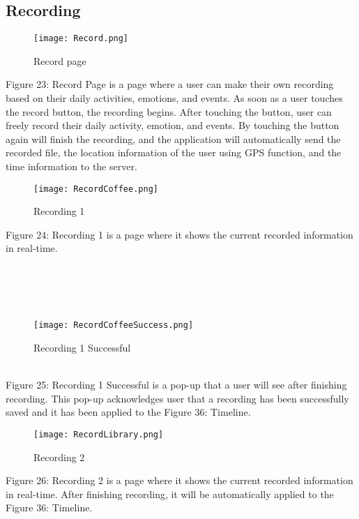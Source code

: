 \documentclass[conference]{IEEEtran}
\begin{document}
\subsection{Recording}
\begin{figure}[h]
\centerline{\texttt{[image: Record.png]}}
\caption{Record page}
\label{fig}
\end{figure}
Figure 23: Record Page is a page where a user can make their own recording based on their daily activities, emotions, and events. As soon as a user touches the record button, the recording begins. After touching the button, user can freely record their daily activity, emotion, and events. By touching the button again will finish the recording, and the application will automatically send the recorded file, the location information of the user using GPS function, and the time information to the server. 

\begin{figure}[h]
\centerline{\texttt{[image: RecordCoffee.png]}}
\caption{Recording 1}
\label{fig}
\end{figure}
Figure 24: Recording 1 is a page where it shows the current recorded information in real-time.
\\\\\\\\\\
\begin{figure}[h]
\centerline{\texttt{[image: RecordCoffeeSuccess.png]}}
\caption{Recording 1 Successful}
\label{fig}
\end{figure}
\\
\indent Figure 25: Recording 1 Successful is a pop-up that a user will see after finishing recording. This pop-up acknowledges user that a recording has been successfully saved and it has been applied to the Figure 36: Timeline.

\begin{figure}[h]
\centerline{\texttt{[image: RecordLibrary.png]}}
\caption{Recording 2}
\label{fig}
\end{figure}
Figure 26: Recording 2 is a page where it shows the current recorded information in real-time. After finishing recording, it will be automatically applied to the Figure 36: Timeline.
\end{document}
